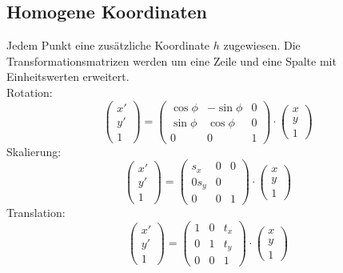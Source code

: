 \documentclass{report}
\begin{document}
\subsection{Homogene Koordinaten}
Jedem Punkt eine zusätzliche Koordinate $h$ zugewiesen. Die Transformationsmatrizen werden um eine Zeile und eine Spalte mit Einheitswerten erweitert.\\Rotation:
\begin{equation}\left(\begin{matrix}x'\\y'\\1\end{matrix}\right) = \left(\begin{matrix}\cos{\phi} & -\sin{\phi} & 0\\ \sin{\phi} & \cos{\phi} & 0 \\ 0 & 0 &  1\end{matrix}\right) \cdot \left(\begin{matrix}x\\y\\1\end{matrix}\right) \end{equation}
Skalierung:
\begin{equation}\left(\begin{matrix}x'\\y'\\1\end{matrix}\right) = \left(\begin{matrix}s_x & 0 & 0 \\ 0 s_y & 0 \\ 0 & 0 & 1\end{matrix}\right) \cdot \left(\begin{matrix}x\\y\\1\end{matrix}\right) \end{equation}
Translation:
\begin{equation}\left(\begin{matrix}x'\\y'\\1\end{matrix}\right) = \left(\begin{matrix}1 & 0 & t_x \\ 0 & 1 & t_y \\ 0 & 0 & 1\end{matrix}\right) \cdot \left(\begin{matrix}x\\y\\1\end{matrix}\right) \end{equation}
\end{document}
